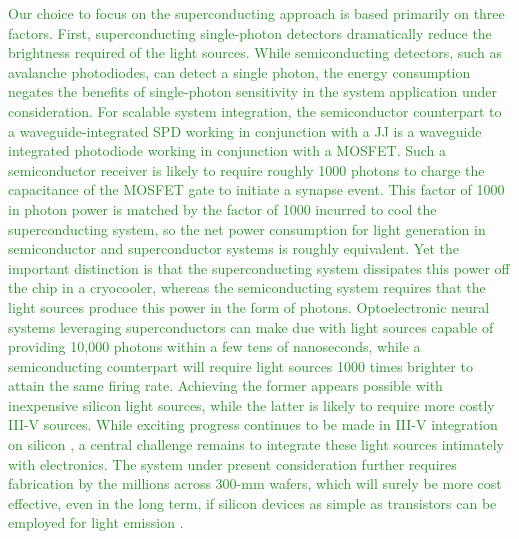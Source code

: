 \documentclass[twocolumn]{article}
\begin{document}
{\textcolor{ForestGreen}{Our choice to focus on the superconducting approach is based primarily on three factors. First, superconducting single-photon detectors dramatically reduce the brightness required of the light sources. While semiconducting detectors, such as avalanche photodiodes, can detect a single photon, the energy consumption negates the benefits of single-photon sensitivity in the system application under consideration. For scalable system integration, the semiconductor counterpart to a waveguide-integrated SPD working in conjunction with a JJ is a waveguide integrated photodiode working in conjunction with a MOSFET. Such a semiconductor receiver is likely to require roughly 1000 photons to charge the capacitance of the MOSFET gate \cite{mi2017} to initiate a synapse event. This factor of 1000 in photon power is matched by the factor of 1000 incurred to cool the superconducting system, so the net power consumption for light generation in semiconductor and superconductor systems is roughly equivalent. Yet the important distinction is that the superconducting system dissipates this power off the chip in a cryocooler, whereas the semiconducting system requires that the light sources produce this power in the form of photons. Optoelectronic neural systems leveraging superconductors can make due with light sources capable of providing 10,000 photons within a few tens of nanoseconds, while a semiconducting counterpart will require light sources 1000 times brighter to attain the same firing rate. Achieving the former appears possible with inexpensive silicon light sources, while the latter is likely to require more costly III-V sources. While exciting progress continues to be made in III-V integration on silicon \cite{hala2020}, a central challenge remains to integrate these light sources intimately with electronics. The system under present consideration further requires fabrication by the millions across 300-mm wafers, which will surely be more cost effective, even in the long term, if silicon devices as simple as transistors can be employed for light emission \cite{buch2017}.}

}
\end{document}
